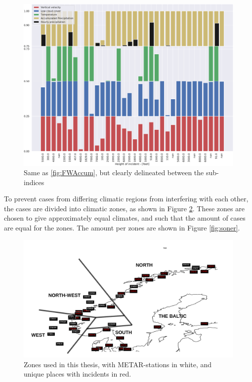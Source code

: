 \begin{figure}[H]
    \centering
    \includegraphics[width=\textwidth]{Figures/FWDecomp.pdf}
    \caption{Same as \ref{fig:FWAccum}, but clearly delineated between the sub-indices}
    \label{fig:FWDecomp}
\end{figure}





To prevent cases from differing climatic regions from interfering with each other, the cases are divided into climatic zones, as shown in Figure \ref{fig:Stationsmap}. These zones are chosen to give approximately equal climates, and such that the amount of cases are equal for the zones. The amount per zones are shown in Figure \ref{fig:soner}.

\begin{figure}
    \centering
    \includegraphics[width=\textwidth]{Figures/METARandHIT.pdf}
    \caption{Zones used in this thesis, with METAR-stations in white, and unique places with incidents in red.}
    \label{fig:Stationsmap}
\end{figure}

